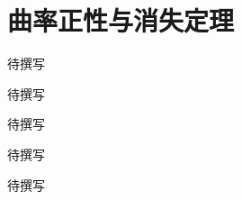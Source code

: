 
% 
% 

\chapter{曲率正性与消失定理}
\label{g4:ch:18}

\begin{chapterabstract}
待撰写
\end{chapterabstract}

\begin{learninggoals}
待撰写
\end{learninggoals}

待撰写






\begin{chaptersummary}
待撰写
\end{chaptersummary}

\BookExercises
待撰写
